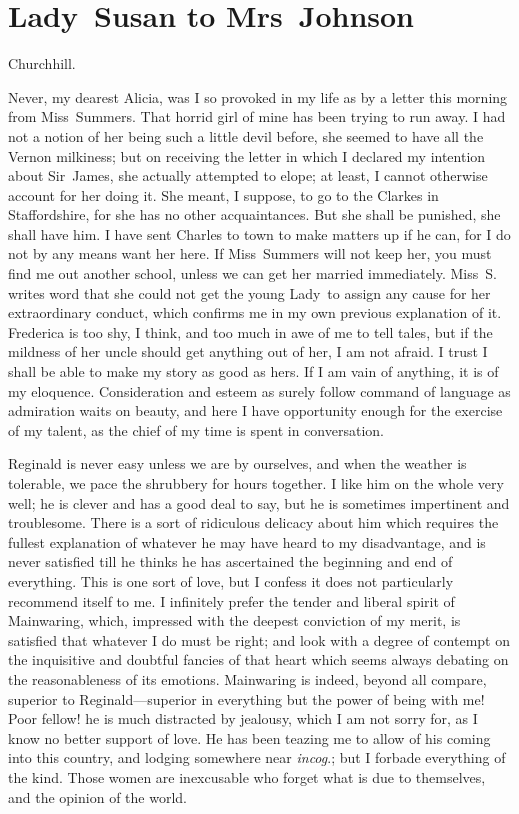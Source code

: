 \chapter{Lady~Susan to Mrs~Johnson}
  
  \begin{mail}{Churchhill.}{}
  
Never, my dearest Alicia, was I so provoked in my life as by a letter this morning from Miss~Summers. That horrid girl of mine has been trying to run away. I had not a notion of her being such a little devil before, she seemed to have all the Vernon milkiness; but on receiving the letter in which I declared my intention about Sir~James, she actually attempted to elope; at least, I cannot otherwise account for her doing it. She meant, I suppose, to go to the Clarkes in Staffordshire, for she has no other acquaintances. But she shall be punished, she shall have him. I have sent Charles to town to make matters up if he can, for I do not by any means want her here. If Miss~Summers will not keep her, you must find me out another school, unless we can get her married immediately. Miss~S. writes word that she could not get the young Lady~to assign any cause for her extraordinary conduct, which confirms me in my own previous explanation of it. Frederica is too shy, I think, and too much in awe of me to tell tales, but if the mildness of her uncle should get anything out of her, I am not afraid. I trust I shall be able to make my story as good as hers. If I am vain of anything, it is of my eloquence. Consideration and esteem as surely follow command of language as admiration waits on beauty, and here I have opportunity enough for the exercise of my talent, as the chief of my time is spent in conversation.

Reginald is never easy unless we are by ourselves, and when the weather is tolerable, we pace the shrubbery for hours together. I like him on the whole very well; he is clever and has a good deal to say, but he is sometimes impertinent and troublesome. There is a sort of ridiculous delicacy about him which requires the fullest explanation of whatever he may have heard to my disadvantage, and is never satisfied till he thinks he has ascertained the beginning and end of everything. This is one sort of love, but I confess it does not particularly recommend itself to me. I infinitely prefer the tender and liberal spirit of Mainwaring, which, impressed with the deepest conviction of my merit, is satisfied that whatever I do must be right; and look with a degree of contempt on the inquisitive and doubtful fancies of that heart which seems always debating on the reasonableness of its emotions. Mainwaring is indeed, beyond all compare, superior to Reginald—superior in everything but the power of being with me! Poor fellow! he is much distracted by jealousy, which I am not sorry for, as I know no better support of love. He has been teazing me to allow of his coming into this country, and lodging somewhere near \textit{incog}.; but I forbade everything of the kind. Those women are inexcusable who forget what is due to themselves, and the opinion of the world. 

\end{mail}
